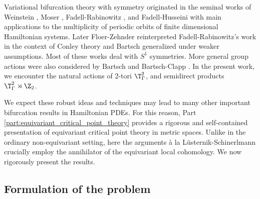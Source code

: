 \documentclass[11pt,a4paper,reqno]{article}
\numberwithin{equation}{section}
\theoremstyle{definition}
\begin{document}
Variational bifurcation theory with symmetry originated in the seminal works of 
Weinstein \cite{We2},  Moser \cite{Mo},  Fadell-Rabinowitz 
\cite{FR}, and Fadell-Husseini \cite{Fadell:1988aa} %
with main applications to the 
multiplicity of periodic 
orbits of finite dimensional Hamiltonian systems. Later Floer-Zehnder \cite{Floer:1988aa} reinterpreted Fadell-Rabinowitz's work in the context of Conley theory and Bartsch \cite{Bart1} generalized \cite{We2,Mo} under weaker assumptions. Most of these works deal with $S^1$ symmetries. More general group actions were also considered by Bartsch  and Bartsch-Clapp \cite{Bartsch:1990aa}.
In the present work,
we encounter  the natural  actions of  2-tori $ \T^2_\Gamma $, and semidirect products $ \T^2_\Gamma \rtimes \Z_2 $.

 We expect these robust ideas and techniques may lead to many other important bifurcation results in Hamiltonian PDEs.  
 For this reason, 
 Part \ref{part:equivariant_critical_point_theory} provides a rigorous and self-contained 
presentation
of equivariant critical  
 point theory in metric spaces. Unlike in the ordinary non-equivariant setting, here the arguments à la L\"usternik-Schinerlmann crucially employ the annihilator of the equivariant local cohomology.
  We now rigorously present the results.

\subsection{Formulation of the problem}  
\end{document}

